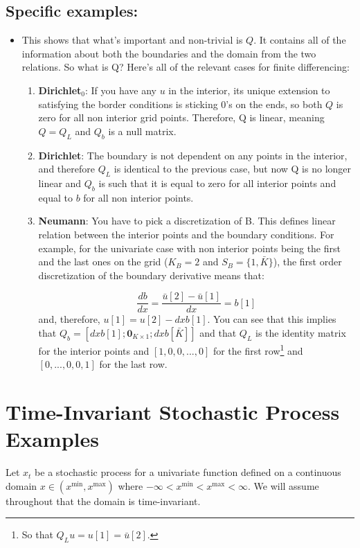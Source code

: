 \documentclass[11pt]{article}
\begin{document}
	\subsection{Specific examples:}
	\begin{itemize}
		\item This shows that what's important and non-trivial is $Q$. It contains all of the information about both the boundaries and the domain from the two relations. So what is Q? Here's all of the relevant cases for finite differencing:
		\begin{enumerate}
			\item \textbf{Dirichlet$_0$}: If you have any $u$ in the interior, its unique extension to satisfying the border conditions is sticking $0$'s on the ends, so both $Q$ is zero for all non interior grid points. Therefore, Q is linear, meaning $Q = Q_L$ and $Q_b$ is a null matrix.

			\item \textbf{Dirichlet}: The boundary is not dependent on any points in the interior, and therefore $Q_L$ is identical to the previous case, but now Q is no longer linear and
	 		$Q_b$ is such that it is equal to zero for all interior points and equal to $b$ for all non interior points.

			\item \textbf{Neumann}: You have to pick a discretization of B. This defines linear relation between the interior points and the boundary conditions. For example, for the univariate case with non interior points being the first and the last ones on the grid ($K_B = 2$ and $S_B = \{1,\bar{K}\}$), the first order discretization of the boundary derivative means that:

			\begin{equation}
				\frac{db}{dx} = \frac{\bar{u}[2] - \bar{u}[1]}{dx} = b[1]
			\end{equation}
			and, therefore, $u[1] = u[2] - dx b[1]$. You can see that this implies that $Q_b = [dx b[1];\mathbf{0}_{K \times 1};dx b[\bar{K}]]$ and that $Q_L$ is the identity matrix for the interior points and $[1,0, 0,...,0]$ for the first row\footnote{So that $Q_L u = u[1] = \bar{u}[2]$.} and $[0,...,0,0,1]$ for the last row.%

		\end{enumerate}
	\end{itemize}

\section{Time-Invariant Stochastic Process Examples}\label{sec:examples}
Let $x_t$ be a stochastic process for a univariate function defined on a continuous domain $x \in (x^{\min}, x^{\max})$ where $-\infty < x^{\min} < x^{\max} < \infty$.  We will assume throughout that the domain is time-invariant.
\end{document}
